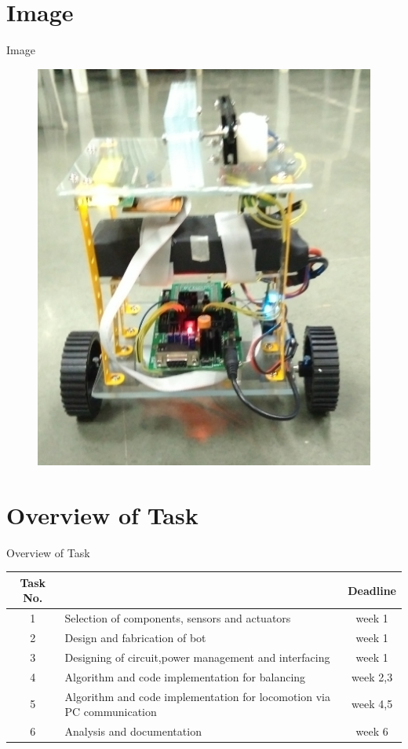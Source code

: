 \documentclass[10pt, a4paper]{beamer}
\begin{document}
\section{Image}
\begin{frame}{Image}
	\begin{figure}
	  \includegraphics[scale=0.1]{Balance_bot.jpg}
	\end{figure}
\end{frame}

\section{Overview of Task}
\begin{frame}{Overview of Task}
	\small
        \begin{tabular}{|c|p{6cm}|c|}
        \hline
         \textbf{Task No.} & \centering {\textbf{Task}} & \textbf{Deadline} \\ 
         \hline
		1 & Selection of components, sensors \quad and \quad actuators & week 1\\
		\hline 
		2 & Design and fabrication of bot & week 1 \\
		\hline 
		3 & Designing of circuit,power management and interfacing & week 1 \\
		\hline
		4 & Algorithm and code implementation for \quad balancing & week 2,3 \\
		\hline
		5 &  Algorithm and code implementation for \qquad  locomotion via PC communication & week 4,5 \\
		\hline 
		6 & Analysis and documentation & week 6 \\
		\hline 
        \end{tabular}
\end{frame}
\end{document}
